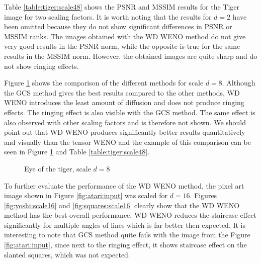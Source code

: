 Table \ref{table:tiger:scale48} shows the PSNR and MSSIM results for the Tiger image for two scaling factors.
It is worth noting that the results for $d=2$ have been omitted because they do not show significant differences in PSNR or MSSIM ranks.
The images obtained with the {WD} WENO method do not give very good results in the PSNR norm, while the opposite is true for the same results in the MSSIM norm.
However, the obtained images are quite sharp and do not show ringing effects.

Figure \ref{fig:tiger:scale8} shows the comparison of the different methods for scale $d=8$.
Although the GCS method gives the best results compared to the other methods, {WD} WENO introduces the least amount of diffusion and does not produce ringing effects.
The ringing effect is also visible with the GCS method. The same effect is also observed with other scaling factors and is therefore not shown. {We should point out that WD WENO produces significantly better results quantitatively and visually than the tensor WENO and the example of this comparison can be seen in Figure \ref{fig:tiger:scale8} and Table \ref{table:tiger:scale48}.} 
	
	\begin{figure}
		\begin{center}
			 \quad 
			 \quad 
			 \quad
			 \quad
			 \quad
			 \quad
			 \quad
			 \quad
			
			\caption{Eye of the tiger, scale $d=8$}
			\label{fig:tiger:scale8}
		\end{center}
	\end{figure}
	
To further evaluate the performance of the {WD} WENO method, the pixel art image shown in Figure \ref{fig:atari:input} was scaled for $d=16$.
Figures \ref{fig:yoshi:scale16} and \ref{fig:squares:scale16} clearly show that the {WD} WENO method has the best overall performance. {WD} WENO reduces the staircase effect significantly for multiple angles of lines which is far better then expected. It is interesting to note that GCS method quite fails with the image from the Figure \ref{fig:atari:input}, since next to the ringing effect, it shows staircase effect on the slanted squares, which was not expected.  
	
